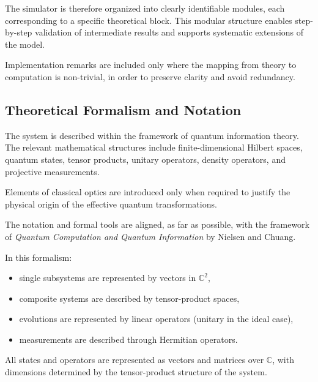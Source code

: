 \documentclass[a4paper]{article}
\begin{document}
The simulator is therefore organized into clearly identifiable modules, each corresponding to a specific theoretical block. This modular structure enables step-by-step validation of intermediate results and supports systematic extensions of the model.

Implementation remarks are included only where the mapping from theory to computation is non-trivial, in order to preserve clarity and avoid redundancy.


\subsection{Theoretical Formalism and Notation}

The system is described within the framework of quantum information theory. The relevant mathematical structures include finite-dimensional Hilbert spaces, quantum states, tensor products, unitary operators, density operators, and projective measurements.

Elements of classical optics are introduced only when required to justify the physical origin of the effective quantum transformations.

\medskip

The notation and formal tools are aligned, as far as possible, with the framework of \textit{Quantum Computation and Quantum Information} by Nielsen and Chuang.

\medskip

In this formalism:
\begin{itemize}
\item single subsystems are represented by vectors in \( \mathbb{C}^2 \),
\item composite systems are described by tensor-product spaces,
\item evolutions are represented by linear operators (unitary in the ideal case),
\item measurements are described through Hermitian operators.
\end{itemize}

\medskip

All states and operators are represented as vectors and matrices over \( \mathbb{C} \), with dimensions determined by the tensor-product structure of the system.

\medskip
\end{document}

